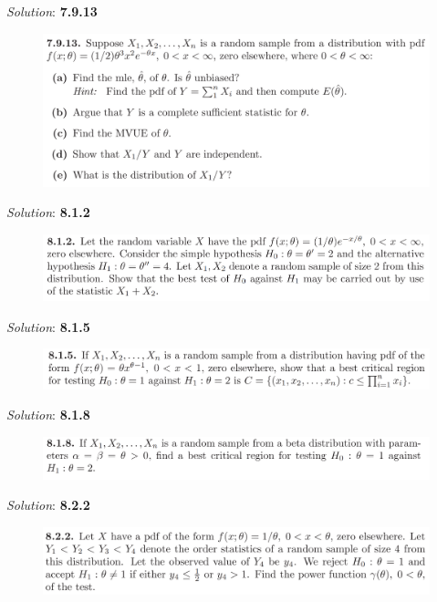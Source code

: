 \documentclass{book}
\theoremstyle{definition}
\begin{document}
\noindent\textit{Solution}:
\newpage
\noindent\textbf{7.9.13}
\begin{figure}[!htb]
	\centering
	\includegraphics[scale=0.5]{7913}
\end{figure}


\noindent\textit{Solution}:
\newpage
\noindent\textbf{8.1.2}
\begin{figure}[!htb]
	\centering
	\includegraphics[scale=0.5]{812}
\end{figure}


\noindent\textit{Solution}:
\newpage
\noindent\textbf{8.1.5}
\begin{figure}[!htb]
	\centering
	\includegraphics[scale=0.5]{815}
\end{figure}


\noindent\textit{Solution}:
\newpage
\noindent\textbf{8.1.8}
\begin{figure}[!htb]
	\centering
	\includegraphics[scale=0.5]{818}
\end{figure}


\noindent\textit{Solution}:
\newpage
\noindent\textbf{8.2.2}
\begin{figure}[!htb]
	\centering
	\includegraphics[scale=0.5]{822}
\end{figure}
\end{document}
